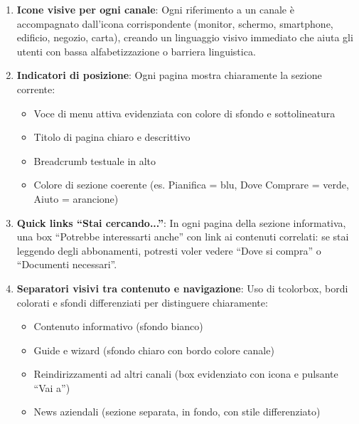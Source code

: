 \begin{tcolorbox}[colback=backgroundColor,colframe=borderColor,arc=2mm]
{\begin{enumerate}[leftmargin=*]
 \item \textbf{Icone visive per ogni canale}: Ogni riferimento a un canale è accompagnato dall'icona corrispondente (monitor, schermo, smartphone, edificio, negozio, carta), creando un linguaggio visivo immediato che aiuta gli utenti con bassa alfabetizzazione o barriera linguistica.

 \item \textbf{Indicatori di posizione}: Ogni pagina mostra chiaramente la sezione corrente:
 \begin{itemize}
   \item Voce di menu attiva evidenziata con colore di sfondo e sottolineatura
   \item Titolo di pagina chiaro e descrittivo
   \item Breadcrumb testuale in alto
   \item Colore di sezione coerente (es. Pianifica = blu, Dove Comprare = verde, Aiuto = arancione)
 \end{itemize}

 \item \textbf{Quick links ``Stai cercando...''}: In ogni pagina della sezione informativa, una box ``Potrebbe interessarti anche'' con link ai contenuti correlati: se stai leggendo degli abbonamenti, potresti voler vedere ``Dove si compra'' o ``Documenti necessari''.

 \item \textbf{Separatori visivi tra contenuto e navigazione}: Uso di tcolorbox, bordi colorati e sfondi differenziati per distinguere chiaramente:
 \begin{itemize}
   \item Contenuto informativo (sfondo bianco)
   \item Guide e wizard (sfondo chiaro con bordo colore canale)
   \item Reindirizzamenti ad altri canali (box evidenziato con icona e pulsante ``Vai a'')
   \item News aziendali (sezione separata, in fondo, con stile differenziato)
 \end{itemize}

\end{enumerate}
}
\end{tcolorbox}

\vspace{0.3cm}

